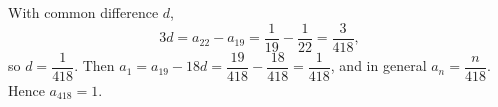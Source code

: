 With common difference $d$,
\[
3d=a_{22}-a_{19}=\dfrac{1}{19}-\dfrac{1}{22}=\dfrac{3}{418},
\]
so $d=\dfrac{1}{418}$. Then $a_1=a_{19}-18d=\dfrac{19}{418}-\dfrac{18}{418}=\dfrac{1}{418}$, and in general $a_n=\dfrac{n}{418}$. Hence $a_{418}=\boxed{1}$.
